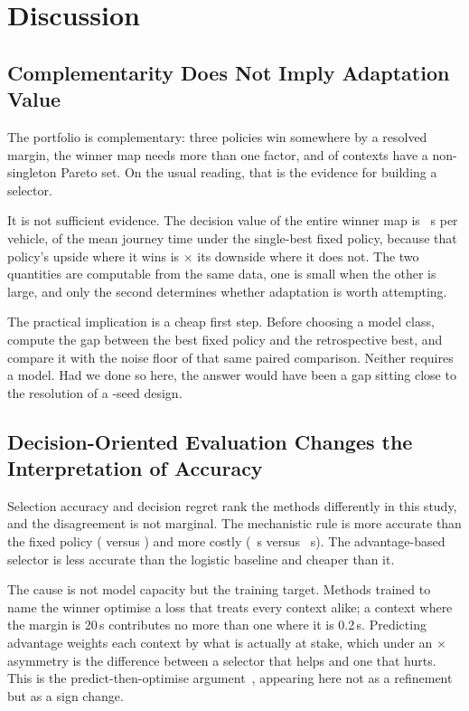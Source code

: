 \section{Discussion}

\subsection{Complementarity Does Not Imply Adaptation Value}

The portfolio is complementary: three policies win somewhere by a resolved
margin, the winner map needs more than one factor, and
\NumParetoNonSingleton{} of contexts have a non-singleton Pareto set. On the
usual reading, that is the evidence for building a selector.

It is not sufficient evidence. The decision value of the entire winner map is
\NumHeadroom~s per vehicle, \NumHeadroomPct{} of the mean journey time under the
single-best fixed policy, because that policy's upside where it wins is
\NumAsymRatio$\times$ its downside where it does not. The two quantities are
computable from the same data, one is small when the other is large, and only
the second determines whether adaptation is worth attempting.

The practical implication is a cheap first step. Before choosing a model class,
compute the gap between the best fixed policy and the retrospective best, and
compare it with the noise floor of that same paired comparison. Neither requires
a model. Had we done so here, the answer would have been a \NumHeadroomPct{} gap
sitting close to the resolution of a \NumSeeds{}-seed design.

\subsection{Decision-Oriented Evaluation Changes the Interpretation of Accuracy}

Selection accuracy and decision regret rank the methods differently in this
study, and the disagreement is not marginal. The mechanistic rule is more
accurate than the fixed policy (\NumBOneTopOne{} versus \NumBZeroTopOne{}) and
more costly (\NumBOneRegret~s versus \NumBZeroRegret~s). The advantage-based
selector is less accurate than the logistic baseline and cheaper than it.

The cause is not model capacity but the training target. Methods trained to name
the winner optimise a loss that treats every context alike; a context where the
margin is 20\,s contributes no more than one where it is 0.2\,s. Predicting
advantage weights each context by what is actually at stake, which under an
\NumAsymRatio$\times$ asymmetry is the difference between a selector that helps
and one that hurts. This is the predict-then-optimise
argument~\cite{elmachtoub2022spo}, appearing here not as a refinement but as a
sign change.

